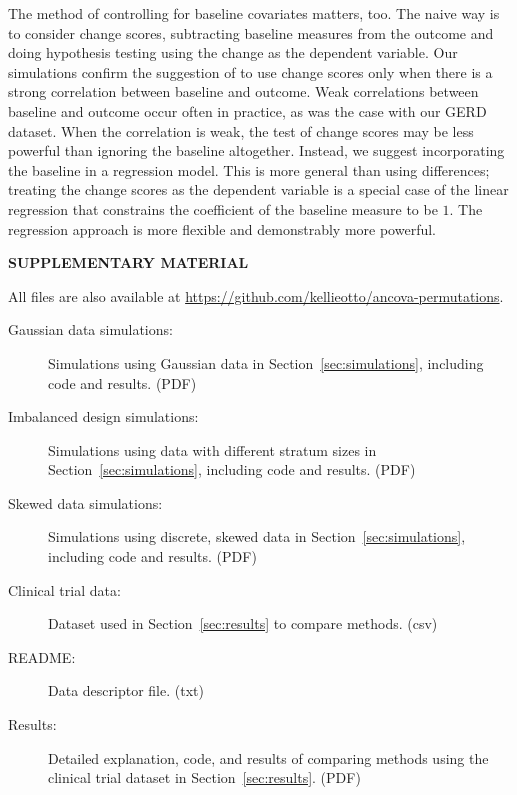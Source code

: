 \documentclass[12pt]{article}
\begin{document}
The method of controlling for baseline covariates matters, too.
The naive way is to consider change scores, subtracting baseline measures from the outcome and doing hypothesis testing using the change as the dependent variable.
Our simulations confirm the suggestion of \cite{frison_repeated_1992} to use change scores only when there is a strong correlation between baseline and outcome.
Weak correlations between baseline and outcome occur often in practice, as was the case with our GERD dataset.
When the correlation is weak, the test of change scores may be less powerful than ignoring the baseline altogether.
Instead, we suggest incorporating the baseline in a regression model.
This is more general than using differences;
treating the change scores as the dependent variable is a special case of the linear regression that constrains the coefficient of the baseline measure to be $1$.
The regression approach is more flexible and demonstrably more powerful.



\bigskip
\begin{center}
{\large\bf SUPPLEMENTARY MATERIAL}
\end{center}
All files are also available at \url{https://github.com/kellieotto/ancova-permutations}.

\begin{description}

\item[Gaussian data simulations:] Simulations using Gaussian data in Section~\ref{sec:simulations}, including code and results. (PDF)
\item[Imbalanced design simulations:] Simulations using data with different stratum sizes in Section~\ref{sec:simulations}, including code and results. (PDF)
\item[Skewed data simulations:] Simulations using discrete, skewed data in Section~\ref{sec:simulations}, including code and results. (PDF)
\item[Clinical trial data:] Dataset used in Section~\ref{sec:results} to compare methods. (csv)
\item[README:] Data descriptor file. (txt)
\item[Results:] Detailed explanation, code, and results of comparing methods using the clinical trial dataset in Section~\ref{sec:results}. (PDF)

\end{description}




\end{document}
